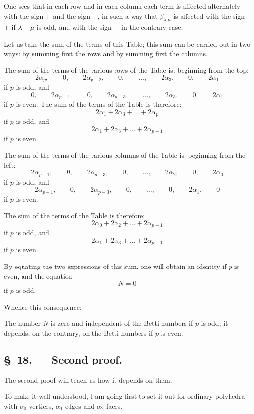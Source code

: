 \documentclass{article}
\begin{document}
One sees that in each row and in each column each term is affected alternately with the sign $+$ and the sign $-$, in such a way that $\beta_{\lambda.\mu}$ is affected with the sign $+$ if $\lambda - \mu$ is odd, and with the sign $-$ in the contrary case.

Let us take the sum of the terms of this Table; this sum can be carried out in two ways: by summing first the rows and by summing first the columns.

The sum of the terms of the various rows of the Table is, beginning from the top:
\[ 2\alpha_{p}, \qquad 0, \qquad 2\alpha_{p-2}, \qquad 0, \qquad \ldots, \qquad 2\alpha_{3}, \qquad 0, \qquad 2\alpha_{1} \]
if $p$ is odd, and
\[ 0, \qquad 2\alpha_{p-1}, \qquad 0, \qquad 2\alpha_{p-3}, \qquad \ldots, \qquad 2\alpha_{3}, \qquad 0, \qquad 2\alpha_{1} \]
if $p$ is even. The sum of the terms of the Table is therefore:
\[ 2\alpha_{1} + 2\alpha_{3} + \ldots + 2\alpha_{p} \]
if $p$ is odd, and
\[ 2\alpha_{1} + 2\alpha_{3} + \ldots + 2\alpha_{p-1} \]
if $p$ is even.

The sum of the terms of the various columns of the Table is, beginning from the left:
\[ 2\alpha_{p-1}, \qquad 0, \qquad 2\alpha_{p-3}, \qquad 0, \qquad \ldots, \qquad 2\alpha_{2}, \qquad 0, \qquad 2\alpha_{0} \]
if $p$ is odd, and
\[ 2\alpha_{p-1}, \qquad 0, \qquad 2\alpha_{p-3}, \qquad 0, \qquad \ldots, \qquad 0, \qquad 2\alpha_{1}, \qquad 0 \]
if $p$ is even.

The sum of the terms of the Table is therefore:
\[ 2\alpha_{0} + 2\alpha_{2} + \ldots + 2\alpha_{p-1} \]
if $p$ is odd, and
\[ 2\alpha_{1} + 2\alpha_{3} + \ldots + 2\alpha_{p-1} \]
if $p$ is even.

By equating the two expressions of this sum, one will obtain an identity if $p$ is even, and the equation
\[ N = 0 \]
if $p$ is odd.

Whence this consequence:

The number $N$ is zero and independent of the Betti numbers if $p$ is odd; it depends, on the contrary, on the Betti numbers if $p$ is even.

\subsection*{\S~18. --- Second proof.}

The second proof will teach us how it depends on them.

To make it well understood, I am going first to set it out for ordinary polyhedra with $\alpha_{0}$ vertices, $\alpha_{1}$ edges and $\alpha_{2}$ faces.
\end{document}
